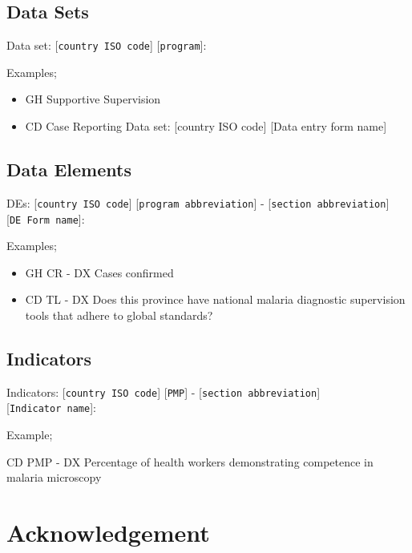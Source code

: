 \documentclass[]{book}
\providecommand{\tightlist}{%
  \setlength{\itemsep}{0pt}\setlength{\parskip}{0pt}}
\begin{document}
\hypertarget{data-sets}{%
\subsection{Data Sets}\label{data-sets}}

Data set: {[}\texttt{country\ ISO\ code}{]} {[}\texttt{program}{]}:

Examples;

\begin{itemize}
\tightlist
\item
  GH Supportive Supervision
\item
  CD Case Reporting \textbar{}Data set: {[}country ISO code{]} {[}Data entry form name{]}
\end{itemize}

\hypertarget{data-elements}{%
\subsection{Data Elements}\label{data-elements}}

DEs: {[}\texttt{country\ ISO\ code}{]} {[}\texttt{program\ abbreviation}{]} - {[}\texttt{section\ abbreviation}{]} {[}\texttt{DE\ Form\ name}{]}:

Examples;

\begin{itemize}
\tightlist
\item
  GH CR - DX Cases confirmed
\item
  CD TL - DX Does this province have national malaria diagnostic supervision tools that adhere to global standards?
\end{itemize}

\hypertarget{indicators}{%
\subsection{Indicators}\label{indicators}}

Indicators: {[}\texttt{country\ ISO\ code}{]} {[}\texttt{PMP}{]} - {[}\texttt{section\ abbreviation}{]} {[}\texttt{Indicator\ name}{]}:

Example;

CD PMP - DX Percentage of health workers demonstrating competence in malaria microscopy

\hypertarget{acknowledgement}{%
\section{Acknowledgement}\label{acknowledgement}}
\end{document}
